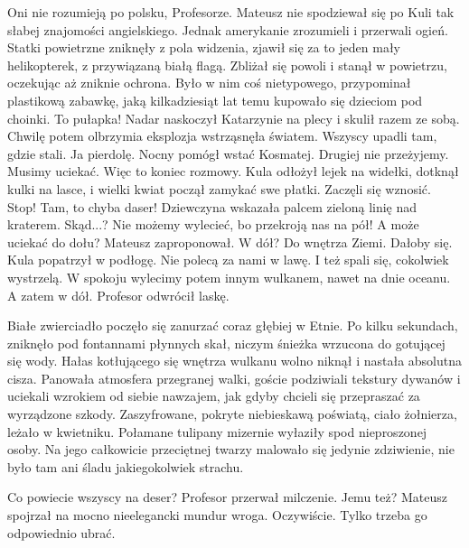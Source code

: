 \begin{dialogue}
\ds{} Oni nie rozumieją po polsku, Profesorze.
\ds{}  \dm{} Mateusz nie spodziewał się po Kuli tak słabej znajomości angielskiego. Jednak amerykanie zrozumieli i przerwali ogień.
\ds{}  \dm{} Statki powietrzne zniknęły z pola widzenia, zjawił się za to jeden mały helikopterek, z przywiązaną białą flagą.
Zbliżał się powoli i stanął w powietrzu, oczekując aż zniknie ochrona. Było w nim coś nietypowego, przypominał plastikową zabawkę, jaką kilkadziesiąt lat temu kupowało się dzieciom pod choinki.
\ds{} To pułapka! \dm{} Nadar naskoczył Katarzynie na plecy i skulił razem ze sobą. Chwilę potem olbrzymia eksplozja wstrząsnęła światem. Wszyscy upadli tam, gdzie stali.
\ds{} Ja pierdolę. \dm{} Nocny pomógł wstać Kosmatej. \dm{} Drugiej nie przeżyjemy. Musimy uciekać.
\ds{} Więc to koniec rozmowy. \dm{} Kula odłożył lejek na widełki, dotknął kulki na lasce, i wielki kwiat począł zamykać swe płatki. Zaczęli się wznosić.
\ds{} Stop! Tam, to chyba daser! \dm{} Dziewczyna wskazała palcem zieloną linię nad kraterem.
\ds{} Skąd...?
\ds{} Nie możemy wylecieć, bo przekroją nas na pół!
\ds{} A może uciekać do dołu? \dm{} Mateusz zaproponował.
\ds{} W dół?
\ds{} Do wnętrza Ziemi.
\ds{} Dałoby się. \dm{} Kula popatrzył w podłogę.
\ds{} Nie polecą za nami w lawę.
\ds{} I też spali się, cokolwiek wystrzelą.
\ds{} W spokoju wylecimy potem innym wulkanem, nawet na dnie oceanu.
\ds{} A zatem w dół. \dm{} Profesor odwrócił laskę.
\end{dialogue}

Białe zwierciadło poczęło się zanurzać coraz głębiej w Etnie.
Po kilku sekundach, zniknęło pod fontannami płynnych skał, niczym śnieżka wrzucona do gotującej się wody.
Hałas kotłującego się wnętrza wulkanu wolno niknął i nastała absolutna cisza.
Panowała atmosfera przegranej walki, goście podziwiali tekstury dywanów i uciekali wzrokiem od siebie nawzajem, jak gdyby chcieli się przepraszać za wyrządzone szkody.
Zaszyfrowane, pokryte niebieskawą poświatą, ciało żołnierza, leżało w kwietniku.
Połamane tulipany mizernie wyłaziły spod nieproszonej osoby.
Na jego całkowicie przeciętnej twarzy malowało się jedynie zdziwienie, nie było tam ani śladu jakiegokolwiek strachu.

\begin{dialogue}
\ds{} Co powiecie wszyscy na deser? \dm{} Profesor przerwał milczenie.
\ds{} Jemu też? \dm{} Mateusz spojrzał na mocno nieelegancki mundur wroga.
\ds{} Oczywiście. Tylko trzeba go odpowiednio ubrać.
\end{dialogue}

